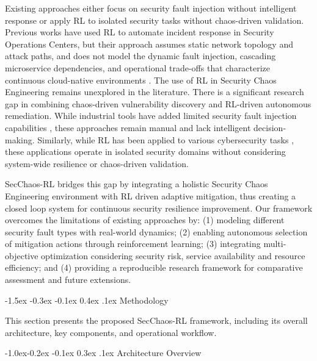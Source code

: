 \documentclass[conference,10pt]{IEEEtran}
\makeatletter
\renewcommand\section{\@startsection{section}{1}{\z@}%
	{-1.5ex \@plus -0.3ex \@minus -0.1ex}%
	{0.4ex \@plus.1ex}%
	{\normalfont\large\bfseries\centering}}
\renewcommand\subsection{\@startsection{subsection}{2}{\z@}%
	{-1.0ex\@plus -0.2ex \@minus -0.1ex}%
	{0.3ex \@plus .1ex}%
	{\normalfont\normalsize\itshape}}
\makeatother
\begin{document}
Existing approaches either focus on security fault injection without intelligent response or apply RL to isolated security tasks without chaos-driven validation. Previous works have used RL to automate incident response in Security Operations Centers, but their approach assumes static network topology and attack paths, and does not model the dynamic fault injection, cascading microservice dependencies, and operational trade-offs that characterize continuous cloud-native environments \cite{standen2021cyborg}. The use of RL in Security Chaos Engineering remains unexplored in the literature. There is a significant research gap in combining chaos-driven vulnerability discovery and RL-driven autonomous remediation. While industrial tools have added limited security fault injection capabilities \cite{chaosblade2021, litmus2022}, these approaches remain manual and lack intelligent decision-making. Similarly, while RL has been applied to various cybersecurity tasks \cite{nguyen2021deep, liu2025autonomous}, these applications operate in isolated security domains without considering system-wide resilience or chaos-driven validation.

SecChaos-RL bridges this gap by integrating a holistic Security Chaos Engineering environment with RL driven adaptive mitigation, thus creating a closed loop system for continuous security resilience improvement. Our framework overcomes the limitations of existing approaches by: (1) modeling different security fault types with real-world dynamics; (2) enabling autonomous selection of mitigation actions through reinforcement learning; (3) integrating multi-objective optimization considering security risk, service availability and resource efficiency; and (4) providing a reproducible research framework for comparative assessment and future extensions.


\section{Methodology}

This section presents the proposed SecChaos-RL framework, including its overall architecture, key components, and operational workflow.

\subsection{Architecture Overview}
\end{document}
